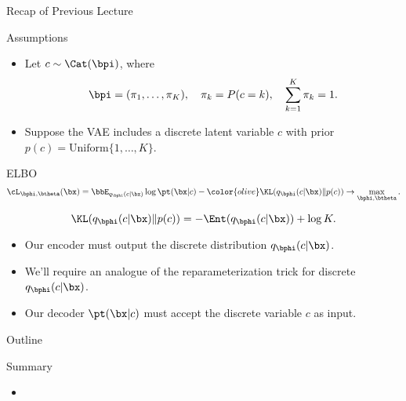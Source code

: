 \documentclass{beamer}
\begin{document}
\begin{frame}
	\titlepage
	\resetonslide
\end{frame}
\begin{frame}{Recap of Previous Lecture}
	\vspace{-0.3cm}
	\begin{block}{Assumptions}
		\begin{itemize}
			\item Let $c \sim \Cat(\bpi)$, where 
			\vspace{-0.6cm}
			\[
				\bpi = (\pi_1, \dots, \pi_K), \quad \pi_k = P(c = k), \quad \sum_{k=1}^K \pi_k = 1.
			\]
			\vspace{-0.7cm}
			\item Suppose the VAE includes a discrete latent variable $c$ with prior $p(c) = \text{Uniform}\{1, \dots, K\}$.
		\end{itemize}
	\end{block}
	\vspace{-0.3cm}
	\begin{block}{ELBO}
		\vspace{-0.6cm}
		\[
			\cL_{\bphi, \btheta}(\bx)  = \bbE_{q_{\bphi}(c| \bx)} \log \pt(\bx| c) - {\color{olive} \KL(q_{\bphi}(c| \bx) \| p(c))} \rightarrow \max_{\bphi, \btheta}.
		\]
	\end{block}
	\vspace{-1.0cm}
	\[
		\KL(q_{\bphi}(c| \bx) \| p(c)) = - \Ent(q_{\bphi}(c| \bx)) + \log K. 
	\]		
	\vspace{-0.5cm}
	\begin{itemize}
		\item Our encoder must output the discrete distribution $q_{\bphi}(c| \bx)$.
		\item We'll require an analogue of the reparameterization trick for discrete $q_{\bphi}(c| \bx)$.
		\item Our decoder $\pt(\bx| c)$ must accept the discrete variable $c$ as input.
	\end{itemize}
\end{frame}
\begin{frame}{Outline}
	\tableofcontents
\end{frame}
\begin{frame}{Summary}
	\begin{itemize}
		\item
	\end{itemize}
\end{frame}
\end{document}
